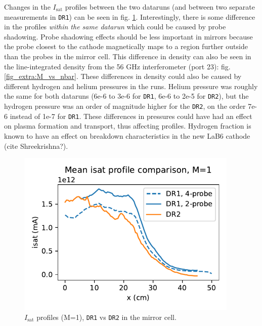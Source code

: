 Changes in the $I_\text{sat}$ profiles between the two dataruns (and between two separate measurements in \texttt{DR1}) can be seen in fig. \ref{fig_extra:DR1-DR2_isat_profile_comparison}. Interestingly, there is some difference in the profiles \emph{within the same datarun} which could be caused by probe shadowing. Probe shadowing effects should be less important in mirrors because the probe closest to the cathode magnetically maps to a region further outside than the probes in the mirror cell. This difference in density can also be seen in the line-integrated density from the 56 GHz interferometer (port 23): fig. \ref{fig_extra:M_vs_nbar}. These differences in density could also be caused by different hydrogen and helium pressures in the runs. Helium pressure was roughly the same for both dataruns (6e-6 to 3e-6 for \texttt{DR1}, 6e-6 to 2e-5 for \texttt{DR2}), but the hydrogen pressure was an order of magnitude higher for the \texttt{DR2}, on the order 7e-6 instead of 1e-7 for \texttt{DR1}. These differences in pressures could have had an effect on plasma formation and transport, thus affecting profiles. Hydrogen fraction is known to have an effect on breakdown characteristics in the new LaB6 cathode (cite Shreekrishna?).
\begin{figure}
    \centering
    \includegraphics[width=300pt]{figures/extra/isat_profile_comparison.pdf}
    \caption[$I_\text{sat}$ profiles (M=1), \texttt{DR1} vs \texttt{DR2}]{$I_\text{sat}$ profiles (M=1), \texttt{DR1} vs \texttt{DR2} in the mirror cell.}
    \label{fig_extra:DR1-DR2_isat_profile_comparison}
\end{figure}

